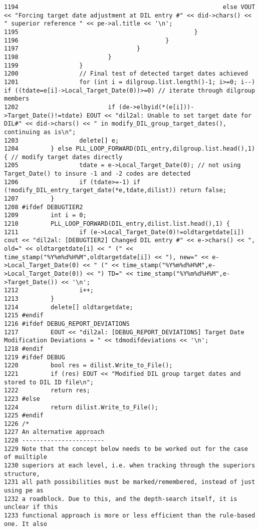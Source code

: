 \begin{verbatim}
1194                                                         else VOUT << "Forcing target date adjustment at DIL entry #" << did->chars() << " superior reference " << pe->al.title << '\n';
1195                                                 }
1196                                         }
1197                                 }
1198                         }
1199                 }
1200                 // Final test of detected target dates achieved
1201                 for (int i = dilgroup.list.length()-1; i>=0; i--) if ((tdate=e[i]->Local_Target_Date(0))>=0) // iterate through dilgroup members
1202                         if (de->elbyid(*(e[i]))->Target_Date()!=tdate) EOUT << "dil2al: Unable to set target date for DIL#" << did->chars() << " in modify_DIL_group_target_dates(), continuing as is\n";
1203                 delete[] e;
1204         } else PLL_LOOP_FORWARD(DIL_entry,dilgroup.list.head(),1) { // modify target dates directly
1205                 tdate = e->Local_Target_Date(0); // not using Target_Date() to insure -1 and -2 codes are detected
1206                 if (tdate>=-1) if (!modify_DIL_entry_target_date(*e,tdate,dilist)) return false;
1207         }
1208 #ifdef DEBUGTIER2
1209         int i = 0;
1210         PLL_LOOP_FORWARD(DIL_entry,dilist.list.head(),1) {
1211                 if (e->Local_Target_Date(0)!=oldtargetdate[i]) cout << "dil2al: [DEBUGTIER2] Changed DIL entry #" << e->chars() << ", old=" << oldtargetdate[i] << " (" << time_stamp("%Y%m%d%H%M",oldtargetdate[i]) << "), new=" << e->Local_Target_Date(0) << " (" << time_stamp("%Y%m%d%H%M",e->Local_Target_Date(0)) << ") TD=" << time_stamp("%Y%m%d%H%M",e->Target_Date()) << '\n';
1212                 i++;
1213         }
1214         delete[] oldtargetdate;
1215 #endif
1216 #ifdef DEBUG_REPORT_DEVIATIONS
1217         EOUT << "dil2al: [DEBUG_REPORT_DEVIATIONS] Target Date Modification Deviations = " << tdmodifdeviations << '\n';
1218 #endif
1219 #ifdef DEBUG
1220         bool res = dilist.Write_to_File();
1221         if (res) EOUT << "Modified DIL group target dates and stored to DIL ID file\n";
1222         return res;
1223 #else
1224         return dilist.Write_to_File();
1225 #endif
1226 /*
1227 An alternative approach
1228 -----------------------
1229 Note that the concept below needs to be worked out for the case of muiltiple
1230 superiors at each level, i.e. when tracking through the superiors structure,
1231 all path possibilities must be marked/remembered, instead of just using pe as
1232 a roadblock. Due to this, and the depth-search itself, it is unclear if this
1233 functional approach is more or less efficient than the rule-based one. It also

\end{verbatim}
